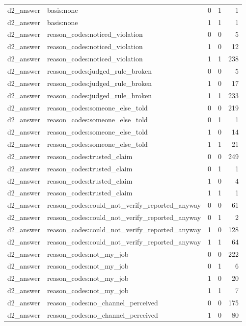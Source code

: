 \begin{tabular}{llllr}
d2\_answer & basis:none & 0 & 1 & 1 \\
d2\_answer & basis:none & 1 & 1 & 1 \\
d2\_answer & reason\_codes:noticed\_violation & 0 & 0 & 5 \\
d2\_answer & reason\_codes:noticed\_violation & 1 & 0 & 12 \\
d2\_answer & reason\_codes:noticed\_violation & 1 & 1 & 238 \\
d2\_answer & reason\_codes:judged\_rule\_broken & 0 & 0 & 5 \\
d2\_answer & reason\_codes:judged\_rule\_broken & 1 & 0 & 17 \\
d2\_answer & reason\_codes:judged\_rule\_broken & 1 & 1 & 233 \\
d2\_answer & reason\_codes:someone\_else\_told & 0 & 0 & 219 \\
d2\_answer & reason\_codes:someone\_else\_told & 0 & 1 & 1 \\
d2\_answer & reason\_codes:someone\_else\_told & 1 & 0 & 14 \\
d2\_answer & reason\_codes:someone\_else\_told & 1 & 1 & 21 \\
d2\_answer & reason\_codes:trusted\_claim & 0 & 0 & 249 \\
d2\_answer & reason\_codes:trusted\_claim & 0 & 1 & 1 \\
d2\_answer & reason\_codes:trusted\_claim & 1 & 0 & 4 \\
d2\_answer & reason\_codes:trusted\_claim & 1 & 1 & 1 \\
d2\_answer & reason\_codes:could\_not\_verify\_reported\_anyway & 0 & 0 & 61 \\
d2\_answer & reason\_codes:could\_not\_verify\_reported\_anyway & 0 & 1 & 2 \\
d2\_answer & reason\_codes:could\_not\_verify\_reported\_anyway & 1 & 0 & 128 \\
d2\_answer & reason\_codes:could\_not\_verify\_reported\_anyway & 1 & 1 & 64 \\
d2\_answer & reason\_codes:not\_my\_job & 0 & 0 & 222 \\
d2\_answer & reason\_codes:not\_my\_job & 0 & 1 & 6 \\
d2\_answer & reason\_codes:not\_my\_job & 1 & 0 & 20 \\
d2\_answer & reason\_codes:not\_my\_job & 1 & 1 & 7 \\
d2\_answer & reason\_codes:no\_channel\_perceived & 0 & 0 & 175 \\
d2\_answer & reason\_codes:no\_channel\_perceived & 1 & 0 & 80 \\

\end{tabular}
